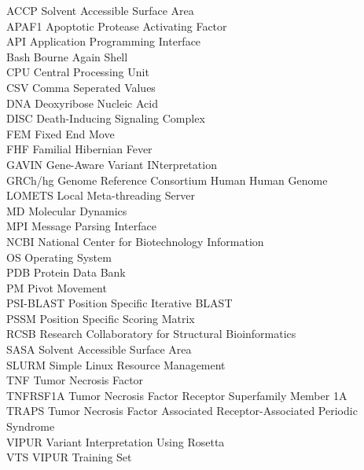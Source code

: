 ACCP Solvent Accessible Surface Area\\
APAF1 Apoptotic Protease Activating Factor\\
API Application Programming Interface\\
Bash Bourne Again Shell\\
CPU Central Processing Unit\\
CSV Comma Seperated Values\\
DNA Deoxyribose Nucleic Acid\\
DISC Death-Inducing Signaling Complex\\
FEM Fixed End Move\\
FHF Familial Hibernian Fever\\
GAVIN Gene-Aware Variant INterpretation\\
GRCh/hg Genome Reference Consortium Human Human Genome\\
LOMETS Local Meta-threading Server\\
MD	Molecular Dynamics\\
MPI Message Parsing Interface\\
NCBI National Center for Biotechnology Information\\
OS Operating System\\
PDB Protein Data Bank\\
PM Pivot Movement\\
PSI-BLAST Position Specific Iterative BLAST\\
PSSM Position Specific Scoring Matrix\\
RCSB Research Collaboratory for Structural Bioinformatics\\
SASA Solvent Accessible Surface Area\\
SLURM Simple Linux Resource Management\\
TNF Tumor Necrosis Factor\\
TNFRSF1A Tumor Necrosis Factor Receptor Superfamily Member 1A\\
TRAPS Tumor Necrosis Factor Associated Receptor-Associated Periodic Syndrome\\
VIPUR Variant Interpretation Using Rosetta\\
VTS VIPUR Training Set\\